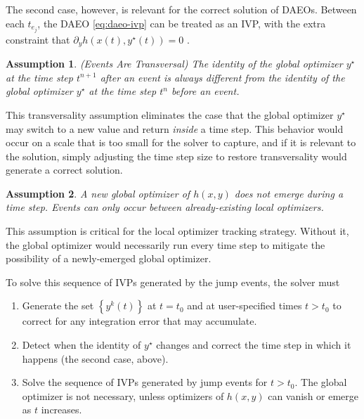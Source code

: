 \documentclass[twoside,leqno, twocolumn]{article}
\newtheorem{assumption}{Assumption}[section]
\begin{document}
The second case, however, is relevant for the correct solution of DAEOs. Between each $t_{e_j}$, the DAEO \eqref{eq:daeo-ivp} can be treated as an IVP, with the extra constraint that $\partial_{y} h(x(t), y^\star(t)) = 0$ \cite{deussenSeparation}.

\begin{assumption} 
	\label{assume:events-transversal}
	(Events Are Transversal)
	The identity of the global optimizer $y^\star$ at the time step $t^{n+1}$ \textit{after} an event is always different from the identity of the global optimizer $y^\star$ at the time step $t^n$ \textit{before} an event. 
\end{assumption}

This transversality assumption eliminates the case that the global optimizer $y^\star$ may switch to a new value and return \textit{inside} a time step. This behavior would occur on a scale that is too small for the solver to capture, and if it is relevant to the solution, simply adjusting the time step size to restore transversality would generate a correct solution.

\begin{assumption}
	\label{assume:global-does-not-emerge}
	A new global optimizer of $h(x, y)$ does not emerge during a time step. Events can only occur between already-existing local optimizers.
\end{assumption}

This assumption is critical for the local optimizer tracking strategy. Without it, the global optimizer would necessarily run every time step to mitigate the possibility of a newly-emerged global optimizer.


To solve this sequence of IVPs generated by the jump events, the solver must 
\begin{enumerate}
	\item Generate the set $\left\{y^k(t)\right\}$ at $t=t_0$ and at user-specified times $t>t_0$ to correct for any integration error that may accumulate.
	\item Detect when the identity of $y^\star$ changes and correct the time step in which it happens (the second case, above).
	\item Solve the sequence of IVPs generated by jump events for $t>t_0$. The global optimizer is not necessary, unless optimizers of $h(x, y)$ can vanish or emerge as $t$ increases.
\end{enumerate}
\end{document}
